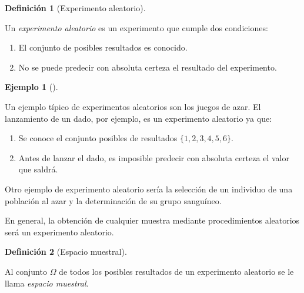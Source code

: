 \documentclass[
  a4paper,
]{scrreport}
\providecommand{\tightlist}{%
  \setlength{\itemsep}{0pt}\setlength{\parskip}{0pt}}\usepackage{longtable,booktabs,array}
\theoremstyle{plain}
\theoremstyle{definition}
\newtheorem{example}{Ejemplo}[chapter]
\theoremstyle{definition}
\newtheorem{definition}{Definición}[chapter]
\theoremstyle{remark}
\begin{document}
\begin{definition}[Experimento
aleatorio]\protect\hypertarget{def-experimento-aleatorio}{}\label{def-experimento-aleatorio}

Un \emph{experimento aleatorio} es un experimento que cumple dos
condiciones:

\begin{enumerate}
\def\labelenumi{\arabic{enumi}.}
\tightlist
\item
  El conjunto de posibles resultados es conocido.
\item
  No se puede predecir con absoluta certeza el resultado del
  experimento.
\end{enumerate}

\end{definition}

\begin{example}[]\protect\hypertarget{exm-experimento-aleatorio}{}\label{exm-experimento-aleatorio}

Un ejemplo típico de experimentos aleatorios son los juegos de azar. El
lanzamiento de un dado, por ejemplo, es un experimento aleatorio ya que:

\begin{enumerate}
\def\labelenumi{\arabic{enumi}.}
\tightlist
\item
  Se conoce el conjunto posibles de resultados \(\{1,2,3,4,5,6\}\).
\item
  Antes de lanzar el dado, es imposible predecir con absoluta certeza el
  valor que saldrá.
\end{enumerate}

Otro ejemplo de experimento aleatorio sería la selección de un individuo
de una población al azar y la determinación de su grupo sanguíneo.

En general, la obtención de cualquier muestra mediante procedimientos
aleatorios será un experimento aleatorio.

\end{example}

\begin{definition}[Espacio
muestral]\protect\hypertarget{def-espacio-muestral}{}\label{def-espacio-muestral}

Al conjunto \(\Omega\) de todos los posibles resultados de un
experimento aleatorio se le llama \emph{espacio muestral}.

\end{definition}
\end{document}
